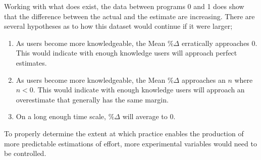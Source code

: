 \documentclass[a4paper,10pt]{article}
\begin{document}
Working with what does exist, the data between programs 0 and 1 does show that the difference between the actual and the estimate are increasing. There are several hypotheses as to how this dataset would continue if it were larger;
\begin{enumerate}
 \item As users become more knowledgeable, the Mean $\%\Delta$ erratically approaches 0. This would indicate with enough knowledge users will approach perfect estimates.
 \item As users become more knowledgeable, the Mean $\%\Delta$ approaches an $n$ where $n < 0$. This would indicate with enough knowledge users will approach an overestimate that generally has the same margin.
 \item On a long enough time scale, $\%\Delta$ will average to 0.
\end{enumerate}

To properly determine the extent at which practice enables the production of more predictable estimations of effort, more experimental variables would need to be controlled.
\end{document}
